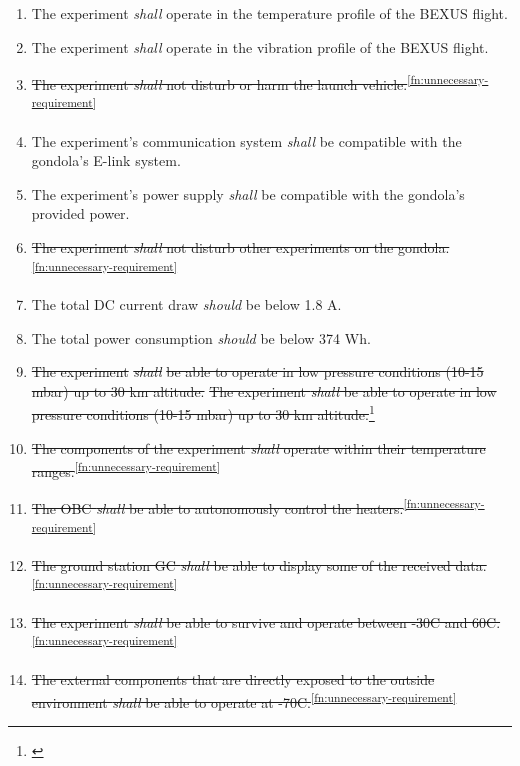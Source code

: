\documentclass[a4paper,12pt,twoside]{article}
\providecommand{\DIFaddtex}[1]{{\protect\color{blue}\uwave{#1}}} %
\providecommand{\DIFdeltex}[1]{{\protect\color{red}\sout{#1}}}                      %
\providecommand{\DIFaddbegin}{} %
\providecommand{\DIFaddend}{} %
\providecommand{\DIFdelbegin}{} %
\providecommand{\DIFdelend}{} %
\providecommand{\DIFadd}[1]{\texorpdfstring{\DIFaddtex{#1}}{#1}} %
\providecommand{\DIFdel}[1]{\texorpdfstring{\DIFdeltex{#1}}{}} %
\newcommand{\DIFscaledelfig}{0.5}
\newlength{\DIFdelgraphicswidth} %
\newlength{\DIFdelgraphicsheight} %
\newcommand{\DIFaddincludegraphics}[2][]{{\color{blue}\fbox{\DIFOincludegraphics[#1]{#2}}}} %
\newcommand{\DIFdelincludegraphics}[2][]{%
\sbox{\DIFdelgraphicsbox}{\DIFOincludegraphics[#1]{#2}}%
\settoboxwidth{\DIFdelgraphicswidth}{\DIFdelgraphicsbox} %
\settoboxtotalheight{\DIFdelgraphicsheight}{\DIFdelgraphicsbox} %
\scalebox{\DIFscaledelfig}{%
\parbox[b]{\DIFdelgraphicswidth}{\usebox{\DIFdelgraphicsbox}\\[-\baselineskip] \rule{\DIFdelgraphicswidth}{0em}}\llap{\resizebox{\DIFdelgraphicswidth}{\DIFdelgraphicsheight}{%
\setlength{\unitlength}{\DIFdelgraphicswidth}%
\begin{picture}(1,1)%
\thicklines\linethickness{2pt} %
{\color[rgb]{1,0,0}\put(0,0){\framebox(1,1){}}}%
{\color[rgb]{1,0,0}\put(0,0){\line( 1,1){1}}}%
{\color[rgb]{1,0,0}\put(0,1){\line(1,-1){1}}}%
\end{picture}%
}\hspace*{3pt}}} %
} %
\DeclareRobustCommand{\DIFaddbegin}{\DIFOaddbegin \let\includegraphics\DIFaddincludegraphics} %
\DeclareRobustCommand{\DIFaddend}{\DIFOaddend \let\includegraphics\DIFOincludegraphics} %
\DeclareRobustCommand{\DIFdelbegin}{\DIFOdelbegin \let\includegraphics\DIFdelincludegraphics} %
\DeclareRobustCommand{\DIFdelend}{\DIFOaddend \let\includegraphics\DIFOincludegraphics} %
\begin{document}
\begin{enumerate}[label=D.\arabic*]
    \item The experiment \textit{shall} operate in the temperature profile of the BEXUS flight.
    \item The experiment \textit{shall} operate in the vibration profile of the BEXUS flight.
    \item \st{The experiment \textit{shall} not disturb or harm the launch vehicle.}\textsuperscript{\ref{fn:unnecessary-requirement}}
    \item The experiment's communication system \textit{shall} be compatible with the gondola's E-link system.
    \item The experiment's power supply \textit{shall} be compatible with the gondola's provided power.
    \item \st{The experiment \textit{shall} not disturb other experiments on the gondola.}\textsuperscript{\ref{fn:unnecessary-requirement}}
    \item The total DC current draw \textit{should} be below 1.8 A.
    \item The total power consumption \textit{should} be below 374 Wh.
    \item \DIFdelbegin \DIFdel{The experiment }\textit{\DIFdel{shall}} %
\DIFdel{be able to operate in low pressure conditions (10-15 mbar) up to 30 km altitude.
    }\DIFdelend \DIFaddbegin \st{The experiment \textit{shall} be able to operate in low pressure conditions (10-15 mbar) up to 30 km altitude.}\footnote{\DIFadd{Repeated in D18}\label{fn:repeat-d18}}
    \DIFaddend \item \st{The components of the experiment \textit{shall} operate within their temperature ranges.}\textsuperscript{\ref{fn:unnecessary-requirement}}
    \item \st{The OBC \textit{shall} be able to autonomously control the heaters.}\textsuperscript{\ref{fn:unnecessary-requirement}}
    \item \st{The ground station GC \textit{shall} be able to display some of the received data.}\textsuperscript{\ref{fn:unnecessary-requirement}}
    \item \st{The experiment \textit{shall} be able to survive and operate between -30\degree C and 60\degree C.}\textsuperscript{\ref{fn:unnecessary-requirement}}
    \item \st{The external components that are directly exposed to the outside environment \textit{shall} be able to operate at -70\degree C.}\textsuperscript{\ref{fn:unnecessary-requirement}}

\end{enumerate}
\end{document}
